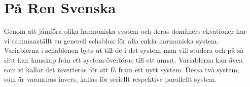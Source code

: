 \documentclass[]{../common/elementary-physics}
\begin{document}
\section{På Ren Svenska}

Genom att jämföra olika harmoniska system och deras domäners ekvationer har vi sammanställt en generell schablon för alla enkla harmoniska system.
Variablerna i schablonen byts ut till de i det system man vill studera och på så sätt kan kunskap från ett system överföras till ett annat.
Variablerna kan även som vi kallar det inverteras för att få fram ett nytt system.
Dessa två system, som är varandras invers, kallas för seriellt respektive parallellt system.



\printbibliography
\end{document}
